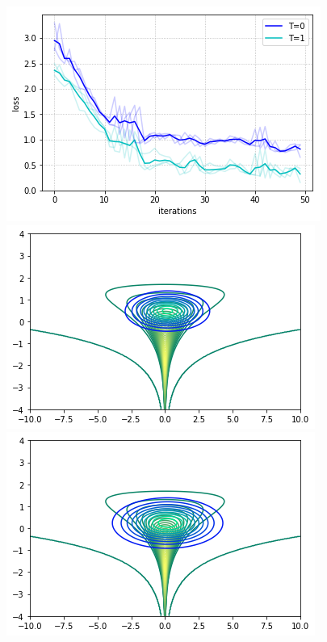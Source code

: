 \begin{figure}[ht]
\begin{center}
\hspace{-0.5em}
  \includegraphics[width=\linewidth]{img/comp_funnel.png}
\endminipage\hfill
{}
  \includegraphics[width=\linewidth]{img/funnel1.png}
\endminipage
{}%
  \includegraphics[width=\linewidth]{img/funnel2.png}

\end{center}
\end{figure}
